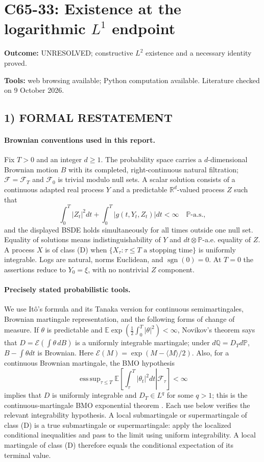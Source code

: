 \documentclass[11pt,a4paper]{article}
\newcommand{\R}{\mathbb R}
\newcommand{\E}{\mathbb E}
\newcommand{\Pp}{\mathbb P}
\newcommand{\Q}{\mathbb Q}
\newcommand{\F}{\mathcal F}
\newcommand{\cE}{\mathcal E}
\newcommand{\sgn}{\operatorname{sgn}}
\DeclareMathOperator*{\esssup}{ess\,sup}
\theoremstyle{definition}
\begin{document}
\section*{C65-33: Existence at the logarithmic \texorpdfstring{$L^1$}{L1} endpoint}
\textbf{Outcome:} UNRESOLVED; constructive $L^2$ existence and a necessary identity proved.\par\textbf{Tools:} web browsing available; Python computation available. Literature checked on 9 October 2026.
\subsection*{1) FORMAL RESTATEMENT}
\paragraph{Brownian conventions used in this report.}
Fix $T>0$ and an integer $d\ge1$. The probability space carries a $d$-dimensional Brownian motion $B$ with its completed, right-continuous natural filtration; $\F=\F_T$ and $\F_0$ is trivial modulo null sets. A scalar solution consists of a continuous adapted real process $Y$ and a predictable $\R^d$-valued process $Z$ such that
\[
 \int_0^T |Z_t|^2dt+\int_0^T|g(t,Y_t,Z_t)|dt<\infty\quad\Pp\text{-a.s.},
\]
and the displayed BSDE holds simultaneously for all times outside one null set. Equality of solutions means indistinguishability of $Y$ and $dt\otimes\Pp$-a.e. equality of $Z$. A process $X$ is of class (D) when $\{X_\tau:\tau\le T\text{ a stopping time}\}$ is uniformly integrable. Logs are natural, norms Euclidean, and $\sgn(0)=0$. At $T=0$ the assertions reduce to $Y_0=\xi$, with no nontrivial $Z$ component.

\paragraph{Precisely stated probabilistic tools.}
We use It\^o's formula and its Tanaka version for continuous semimartingales, Brownian martingale representation, and the following forms of change of measure. If $\theta$ is predictable and $\E\exp(\frac12\int_0^T|\theta|^2)<\infty$, Novikov's theorem says that
$D=\cE(\int\theta\,dB)$ is a uniformly integrable martingale; under $d\Q=D_Td\Pp$, $B-\int\theta dt$ is Brownian. Here $\cE(M)=\exp(M-\langle M\rangle/2)$. Also, for a continuous Brownian martingale, the BMO hypothesis
\[
 \esssup_{\tau\le T}\E\left[\left.\int_\tau^T|\theta_t|^2dt\right|\F_\tau\right]<\infty
\]
implies that $D$ is uniformly integrable and $D_T\in L^q$ for some $q>1$; this is the continuous-martingale BMO exponential theorem \cite{Kazamaki}. Each use below verifies the relevant integrability hypothesis. A local submartingale or supermartingale of class (D) is a true submartingale or supermartingale: apply the localized conditional inequalities and pass to the limit using uniform integrability. A local martingale of class (D) therefore equals the conditional expectation of its terminal value.
\end{document}
